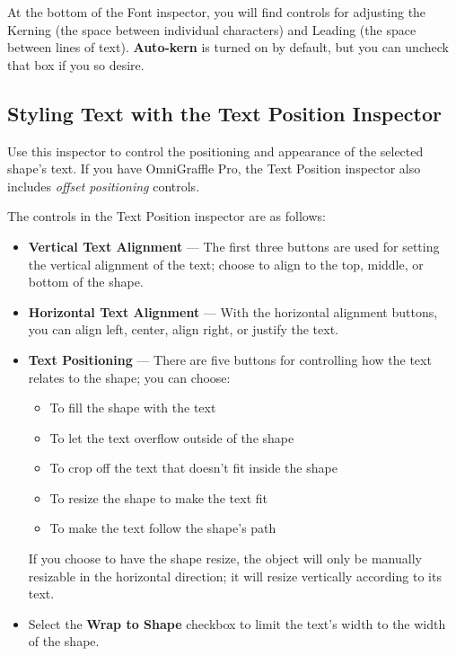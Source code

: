 \documentclass[../main.tex]{subfiles}
\begin{document}
At the bottom of the Font inspector, you will find controls for adjusting the Kerning (the space
between individual characters) and Leading (the space between lines of text).
\textbf{Auto-kern} is turned on by default, but you can uncheck that box if you so desire.

\subsection{Styling Text with the Text Position Inspector}

Use this inspector to control the positioning and appearance of the selected shape's text. If
you have OmniGraffle Pro, the Text Position inspector also includes \textit{offset
positioning} controls.


The controls in the Text Position inspector are as follows:

\begin{itemize}
  \item \textbf{Vertical Text Alignment} --- The first three buttons are used for setting the
    vertical alignment of the text; choose to align to the top, middle, or bottom of the shape.
  \item \textbf{Horizontal Text Alignment} --- With the horizontal alignment buttons, you can
    align left, center, align right, or justify the text.
  \item \textbf{Text Positioning} --- There are five buttons for controlling how the text
    relates to the shape; you can choose:

    \begin{itemize}
      \item To fill the shape with the text
      \item To let the text overflow outside of the shape
      \item To crop off the text that doesn't fit inside the shape
      \item To resize the shape to make the text fit
      \item To make the text follow the shape's path
    \end{itemize}

    If you choose to have the shape resize, the object will only be manually resizable in the
    horizontal direction; it will resize vertically according to its text.
  \item Select the \textbf{Wrap to Shape} checkbox to limit the text's width to the width of the
    shape.
\end{itemize}
\end{document}
